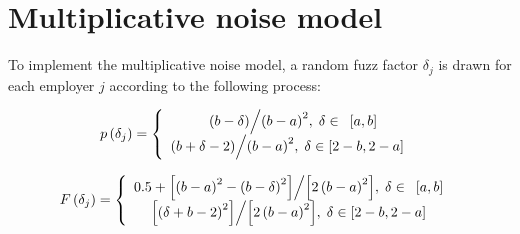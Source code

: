 



\section{Multiplicative noise model\label{sec:disclosure:fuzz}}


To implement  the multiplicative noise model, a
random fuzz factor%
 $\delta _j$ is drawn for each employer $j$ according to
the following process:

\begin{equation*}
p\left( {\delta _j } \right) = \left\{ {{%
\begin{array}{*{20}c} {\mbox{ }{\left( {b - \delta } \right)} \mathord{\left/ {\vphantom {{\left( {b - \delta } \right)} {\left( {b - a} \right)^2}}} \right. \kern-\nulldelimiterspace} {\left( {b - a} \right)^2},\;\delta \in \mbox{ 
}\left[ {a,b} \right]} \\ {{\left( {b + \delta - 2} \right)} \mathord{\left/ {\vphantom {{\left( {b + \delta - 2} \right)} {\left( {b - a} \right)^2}}} \right. \kern-\nulldelimiterspace} {\left( {b - a} \right)^2},\;\delta \in \left[ {2 - b,2 - a} \right]\mbox{ }} \\ \end{array} 
}} \right.
\end{equation*}

\begin{equation*}
F\left( {\delta _j } \right) = \left\{ {{%
\begin{array}{*{20}c} {\mbox{0.5} + {\left[ {\left( {b - a} \right)^2 - \left( {b - \delta } \right)^2} \right]} \mathord{\left/ {\vphantom {{\left[ {\left( {b - a} \right)^2 - \left( {b - \delta } \right)^2} \right]} {\left[ {2\left( {b - a} \right)^2} \right]}}} \right. \kern-\nulldelimiterspace} {\left[ {2\left( {b - a} \right)^2} \right]},\;\delta \in \mbox{ }\left[ {a,b} \right]\mbox{ 
}} \\ {{\left[ {\left( {\delta + b - 2} \right)^2} \right]} \mathord{\left/ {\vphantom {{\left[ {\left( {\delta + b - 2} \right)^2} \right]} {\left[ {2\left( {b - a} \right)^2} \right]}}} \right. \kern-\nulldelimiterspace} {\left[ {2\left( {b - a} \right)^2} \right]},\;\delta \in \left[ {2 - b,2 - a} \right]\mbox{ }} \\ \end{array} 
}} \right.
\end{equation*}

